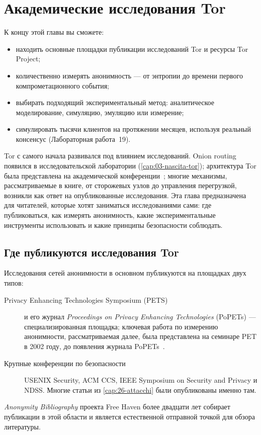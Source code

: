 \chapter{Академические исследования Tor}\label{cap:29-ricerca}

\begin{obiettivi}
К концу этой главы вы сможете:
\begin{itemize}[nosep]
  \item находить основные площадки публикации исследований Tor и ресурсы Tor Project;
  \item количественно измерять анонимность — от энтропии до времени первого компрометационного события;
  \item выбирать подходящий экспериментальный метод: аналитическое моделирование, симуляцию, эмуляцию или измерение;
  \item симулировать тысячи клиентов на протяжении месяцев, используя реальный консенсус (Лабораторная работа~19).
\end{itemize}
\end{obiettivi}

Tor с самого начала развивался под влиянием исследований. Onion routing появился в исследовательской лаборатории (\cref{cap:03-nascita-tor}); архитектура Tor была представлена на академической конференции~\cite{dingledine2004tor}; многие механизмы, рассматриваемые в книге, от сторожевых узлов до управления перегрузкой, возникли как ответ на опубликованные исследования. Эта глава предназначена для читателей, которые хотят заниматься исследованиями сами: где публиковаться, как измерять анонимность, какие экспериментальные инструменты использовать и какие принципы безопасности соблюдать.

\section{Где публикуются исследования Tor}\label{sec:ric-dove}

Исследования сетей анонимности в основном публикуются на площадках двух типов:
\begin{description}
  \item[Privacy Enhancing Technologies Symposium (PETS)] и его журнал \emph{Proceedings on Privacy Enhancing Technologies} (PoPETs) — специализированная площадка; ключевая работа по измерению анонимности, рассматриваемая далее, была представлена на семинаре PET в 2002 году, до появления журнала PoPETs~\cite{diaz2002measuring}.
  \item[Крупные конференции по безопасности] USENIX Security, ACM CCS, IEEE Symposium on Security and Privacy и NDSS. Многие статьи из \cref{cap:26-attacchi} были опубликованы именно там.
\end{description}
\emph{Anonymity Bibliography} проекта Free Haven более двадцати лет собирает публикации в этой области и является естественной отправной точкой для обзора литературы.

